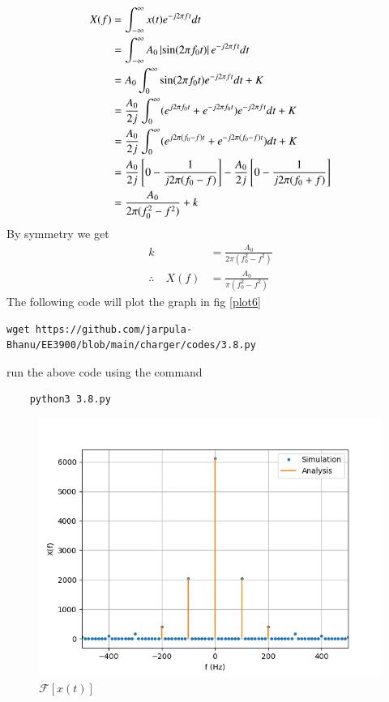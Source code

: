 \documentclass[journal,12pt,twocolumn]{IEEEtran}
\renewcommand\thesection{\arabic{section}}
\begin{document}
\begin{enumerate}[label=\thesection.\arabic*
	,ref=\thesection.\theenumi]
\begin{align}
		X(f)&= \int_{-\infty}^\infty x(t)e^{-j2\pi ft}dt\\
		&= \int_{-\infty}^\infty A_0\left\vert\sin(2\pi f_0t)\right\vert e^{-j2\pi ft}dt\\
		&= A_0 \int_0^\infty \sin(2\pi f_0t)e^{-j2\pi ft}dt + K\\
		&= \frac{A_0}{2j}\int_0^\infty( e^{j2\pi f_0t}+e^{-j2\pi f_0t}) e^{-j2\pi ft} dt + K\\
		&= \frac{A_0}{2j}\int_0^\infty( e^{j2\pi (f_0-f)t}+e^{-j2\pi (f_0-f)t}) dt + K\\
		&= \frac{A_0}{2j} {}\left[0-\frac{1}{j2\pi (f_0-f)}\right]-\frac{A_0}{2j} {}\left[0-\frac{1}{j2\pi (f_0+f)}\right]\\
		&= \frac{A_0}{2\pi (f_0^2-f^2)}+k
	 \end{align}
	 By symmetry we get 
	 \begin{align}
		k &= \frac{A_0}{2\pi (f_0^2-f^2)}\\
		\therefore \quad X(f)&= \frac{A_0}{\pi (f_0^2-f^2)}
	 \end{align}
	 The following code will plot the graph in fig \eqref{plot6}
	\begin{lstlisting}
wget https://github.com/jarpula-Bhanu/EE3900/blob/main/charger/codes/3.8.py
	\end{lstlisting}
	run the above code using the command
	\begin{lstlisting}
	python3 3.8.py
	\end{lstlisting}
	\begin{figure}[!ht]
		\includegraphics[width=\columnwidth]{./figs/3.8.png}
		\caption{$\mathcal{F}[x(t)]$}
		\label{plot6}
	\end{figure}

\end{enumerate}
\end{document}
